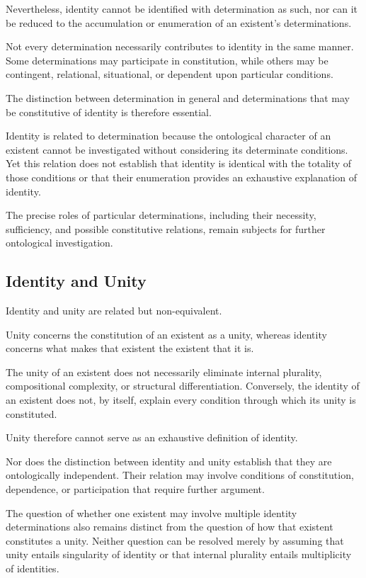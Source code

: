 Nevertheless, identity cannot be identified with
determination as such, nor can it be reduced to the
accumulation or enumeration of an existent's
determinations.

Not every determination necessarily contributes to
identity in the same manner. Some determinations may
participate in constitution, while others may be
contingent, relational, situational, or dependent upon
particular conditions.

The distinction between determination in general
and determinations that may be constitutive of identity
is therefore essential.

Identity is related to determination because the
ontological character of an existent cannot be
investigated without considering its determinate
conditions. Yet this relation does not establish
that identity is identical with the totality of those
conditions or that their enumeration provides an
exhaustive explanation of identity.

The precise roles of particular determinations,
including their necessity, sufficiency, and possible
constitutive relations, remain subjects for further
ontological investigation.

\subsection{Identity and Unity}

Identity and unity are related but non-equivalent.

Unity concerns the constitution of an existent as a
unity, whereas identity concerns what makes that
existent the existent that it is.

The unity of an existent does not necessarily eliminate
internal plurality, compositional complexity, or
structural differentiation. Conversely, the identity
of an existent does not, by itself, explain every
condition through which its unity is constituted.

Unity therefore cannot serve as an exhaustive
definition of identity.

Nor does the distinction between identity and unity
establish that they are ontologically independent.
Their relation may involve conditions of constitution,
dependence, or participation that require further
argument.

The question of whether one existent may involve
multiple identity determinations also remains distinct
from the question of how that existent constitutes
a unity. Neither question can be resolved merely
by assuming that unity entails singularity of identity
or that internal plurality entails multiplicity of
identities.

